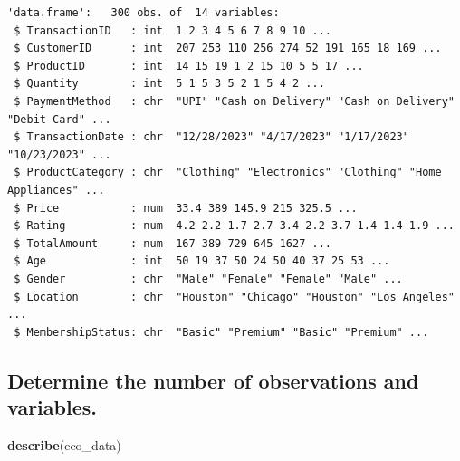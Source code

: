 \documentclass[
]{article}
\newenvironment{Shaded}{\begin{snugshade}}{\end{snugshade}}
\newcommand{\FunctionTok}[1]{\textcolor[rgb]{0.13,0.29,0.53}{\textbf{#1}}}
\newcommand{\NormalTok}[1]{#1}
\begin{document}
\begin{verbatim}
'data.frame':   300 obs. of  14 variables:
 $ TransactionID   : int  1 2 3 4 5 6 7 8 9 10 ...
 $ CustomerID      : int  207 253 110 256 274 52 191 165 18 169 ...
 $ ProductID       : int  14 15 19 1 2 15 10 5 5 17 ...
 $ Quantity        : int  5 1 5 3 5 2 1 5 4 2 ...
 $ PaymentMethod   : chr  "UPI" "Cash on Delivery" "Cash on Delivery" "Debit Card" ...
 $ TransactionDate : chr  "12/28/2023" "4/17/2023" "1/17/2023" "10/23/2023" ...
 $ ProductCategory : chr  "Clothing" "Electronics" "Clothing" "Home Appliances" ...
 $ Price           : num  33.4 389 145.9 215 325.5 ...
 $ Rating          : num  4.2 2.2 1.7 2.7 3.4 2.2 3.7 1.4 1.4 1.9 ...
 $ TotalAmount     : num  167 389 729 645 1627 ...
 $ Age             : int  50 19 37 50 24 50 40 37 25 53 ...
 $ Gender          : chr  "Male" "Female" "Female" "Male" ...
 $ Location        : chr  "Houston" "Chicago" "Houston" "Los Angeles" ...
 $ MembershipStatus: chr  "Basic" "Premium" "Basic" "Premium" ...
\end{verbatim}

\subsection{Determine the number of observations and
variables.}\label{determine-the-number-of-observations-and-variables.}

\begin{Shaded}
\begin{Highlighting}[]
\FunctionTok{describe}\NormalTok{(eco\_data)}
\end{Highlighting}
\end{Shaded}
\end{document}
